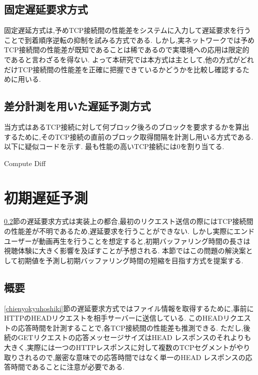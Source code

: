 \documentclass[a4j,12pt]{gradthesis_utf8}
\begin{document}
\subsection{固定遅延要求方式}
\label{kotei}
固定遅延方式は,予めTCP接続間の性能差をシステムに入力して遅延要求を行うことで到着順序逆転の抑制を試みる方式である.
しかし,実ネットワークでは予めTCP接続間の性能差が既知であることは稀であるので実環境への応用は限定的であると言わざるを得ない.
よって本研究では本方式は主として,他の方式がどれだけTCP接続間の性能差を正確に把握できているかどうかを比較し確認するために用いる.

\subsection{差分計測を用いた遅延予測方式}
\label{diff}
当方式はあるTCP接続に対して何ブロック後ろのブロックを要求するかを算出するために,そのTCP接続の直前のブロック取得間隔を計測し用いる方式である.
以下に疑似コードを示す.
最も性能の高いTCP接続には0を割り当てる.

\begin{algorithm}
	\caption{Compute Diff}
	\begin{algorithmic}[1]
		\Else 
		\EndIf
	\end{algorithmic}
	
\end{algorithm}

\section{初期遅延予測}
\label{shoki}
\ref{diff}節の遅延要求方式は実装上の都合,最初のリクエスト送信の際にはTCP接続間の性能差が不明であるため,遅延要求を行うことができない.
しかし実際にエンドユーザーが動画再生を行うことを想定すると,初期バッファリング時間の長さは視聴体験に大きく影響を及ぼすことが予想される.
本節ではこの問題の解決案として初期値を予測し初期バッファリング時間の短縮を目指す方式を提案する.

\subsection{概要}
\label{shokigaiyo}
\ref{chienyokyuhoshiki}節の遅延要求方式ではファイル情報を取得するために,事前にHTTPのHEADリクエストを相手サーバーに送信している.
このHEADリクエストの応答時間を計測することで,各TCP接続間の性能差も推測できる.
ただし,後続のGETリクエストの応答メッセージサイズはHEAD レスポンスのそれよりも大きく,実際には一つのHTTPレスポンスに対して複数のTCPセグメントがやり取りされるので,厳密な意味での応答時間ではなく単一のHEAD レスポンスの応答時間であることに注意が必要である.
\end{document}
